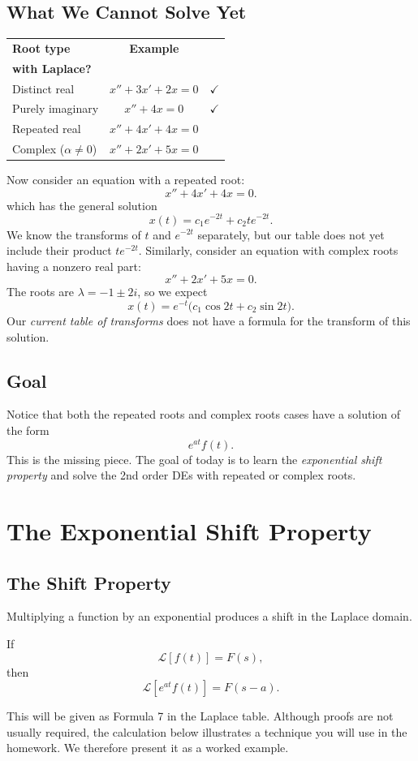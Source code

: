 \documentclass[10pt,letterpaper]{article}
\begin{document}
\subsection{What We Cannot Solve Yet}

\begin{table}
\vspace{-\baselineskip}
\renewcommand{\arraystretch}{1.4}
\setlength{\tabcolsep}{5pt}
\begin{tabular}{|l|c|c|}
\hline
\textbf{Root type}
& \textbf{Example}
& \shortstack{\textbf{Can we solve}\\\textbf{with Laplace?}}\\
\hline
Distinct real & $x''+3x'+2x=0$ & $\checkmark$\\
\hline
Purely imaginary & $x''+4x=0$ & $\checkmark$\\
\hline
Repeated real & $x''+4x'+4x=0$ & \\
\hline
Complex ($\alpha\ne0$) & $x''+2x'+5x=0$ & \\
\hline
\end{tabular}
\end{table}
Now consider an equation with a repeated root:
\[
x''+4x'+4x=0.
\]
which has the general solution
\[
x(t)=c_1e^{-2t}+c_2te^{-2t}.
\]
We know the transforms of $t$ and $e^{-2t}$ separately,
but our table does not yet include their product $te^{-2t}$. 
Similarly, consider an equation with complex roots
having a nonzero real part:
\[
x''+2x'+5x=0.
\]
The roots are $\lambda=-1\pm2i$, so we expect
\[
x(t)=e^{-t}\bigl(c_1\cos2t+c_2\sin2t\bigr).
\]
Our \textit{current table of transforms} does not have a formula for the transform of this solution. 

\subsection{Goal}
Notice that both the repeated roots and complex roots cases have a solution of the form 
\[
e^{at}f(t).
\]
This is the missing piece. The goal of today is to learn the \textit{exponential shift property} and solve the 2nd order DEs with repeated or complex roots.


\section{The Exponential Shift Property}

\subsection{The Shift Property}
Multiplying a function by an exponential produces a shift in the Laplace domain. 
\begin{theorem}
If
\[
\mathcal L[f(t)]=F(s),
\]
then
\[
\mathcal L[e^{at}f(t)]=F(s-a).
\]
\end{theorem}
This will be given as Formula 7 in the Laplace table.
Although proofs are not usually required, the calculation below illustrates a technique you will use in the homework. We therefore present it as a worked example.
\end{document}
